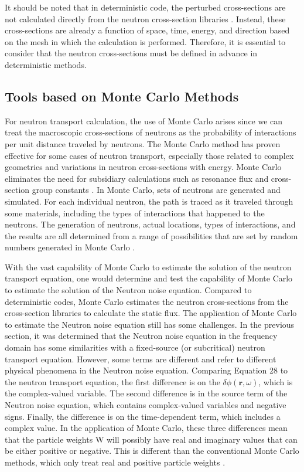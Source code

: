 It should be noted that in deterministic code, the perturbed cross-sections are not calculated directly from the neutron cross-section libraries \cite{ardiansyahEvaluationPBMR400Core2021}. Instead, these cross-sections are already a function of space, time, energy, and direction based on the mesh in which the calculation is performed. Therefore, it is essential to consider that the neutron cross-sections must be defined in advance in deterministic methods. 

\subsection{Tools based on Monte Carlo Methods}

For neutron transport calculation, the use of Monte Carlo arises since we can treat the macroscopic cross-sections of neutrons as the probability of interactions per unit distance traveled by neutrons. The Monte Carlo method has proven effective for some cases of neutron transport, especially those related to complex geometries and variations in neutron cross-sections with energy. Monte Carlo eliminates the need for subsidiary calculations such as resonance flux and cross-section group constants \cite{bellNuclearReactorTheory1970, duderstadtNuclearReactorAnalysis1977}. In Monte Carlo, sets of neutrons are generated and simulated. For each individual neutron, the path is traced as it traveled through some materials, including the types of interactions that happened to the neutrons. The generation of neutrons, actual locations, types of interactions, and the results are all determined from a range of possibilities that are set by random numbers generated in Monte Carlo \cite{lewisComputationalMethodsNeutron1984, luxMonteCarloParticle1991}. 

With the vast capability of Monte Carlo to estimate the solution of the neutron transport equation, one would determine and test the capability of Monte Carlo to estimate the solution of the Neutron noise equation. Compared to deterministic codes, Monte Carlo estimates the neutron cross-sections from the cross-section libraries to calculate the static flux. The application of Monte Carlo to estimate the Neutron noise equation still has some challenges. In the previous section, it was determined that the Neutron noise equation in the frequency domain has some similarities with a fixed-source (or subcritical) neutron transport equation. However, some terms are different and refer to different physical phenomena in the Neutron noise equation. Comparing Equation 28 to the neutron transport equation, the first difference is on the $\delta \phi (\textbf{r}, \omega)$, which is the complex-valued variable. The second difference is in the source term of the Neutron noise equation, which contains complex-valued variables and negative signs. Finally, the difference is on the time-dependent term, which includes a complex value. In the application of Monte Carlo, these three differences mean that the particle weights W will possibly have real and imaginary values that can be either positive or negative. This is different than the conventional Monte Carlo methods, which only treat real and positive particle weights \cite{yamamotoMonteCarloMethod2013}.


